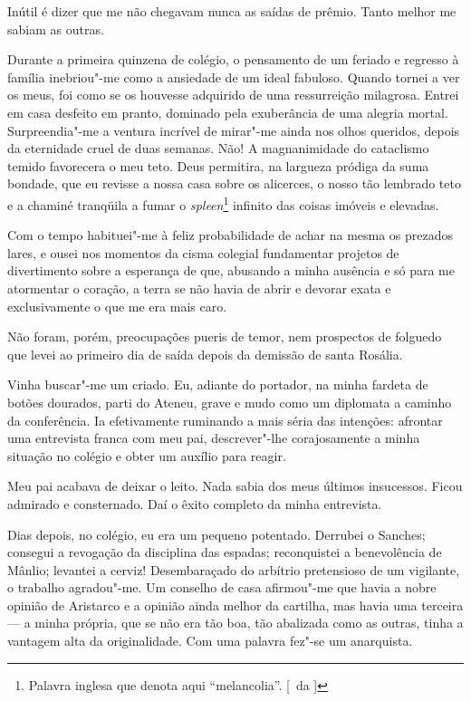Inútil é dizer que me não chegavam nunca as
saídas de prêmio. Tanto melhor me sabiam as outras. 

Durante a primeira
quinzena de colégio, o pensamento de um feriado e regresso à família
inebriou"-me como a ansiedade de um ideal fabuloso. Quando tornei a ver
os meus, foi como se os houvesse adquirido de uma ressurreição
milagrosa. Entrei em casa desfeito em pranto, dominado pela exuberância
de uma alegria mortal. Surpreendia"-me a ventura incrível de
mirar"-me ainda nos olhos queridos, depois da eternidade cruel de duas
semanas. Não! A magnanimidade do cataclismo temido favorecera o meu
teto. Deus permitira, na largueza pródiga da suma bondade, que eu
revisse a nossa casa sobre os alicerces, o nosso tão lembrado teto e a
chaminé tranqüila a fumar o \textit{spleen}\footnote{ Palavra inglesa que denota aqui ``melancolia''. 
[~da ]} infinito das coisas imóveis e elevadas. 

Com o tempo habituei"-me à feliz probabilidade de achar na
mesma os prezados lares, e ousei nos momentos da cisma colegial
fundamentar projetos de divertimento sobre a esperança de que, abusando
a minha ausência e só para me atormentar o coração, a terra se não
havia de abrir e devorar exata e exclusivamente o que me era mais caro.

Não foram, porém, preocupações pueris de temor, nem prospectos de
folguedo que levei ao primeiro dia de saída depois da demissão de santa
Rosália. 

Vinha buscar"-me um criado. Eu, adiante do portador, na minha
fardeta de botões dourados, parti do Ateneu, grave e mudo como um
diplomata a caminho da conferência. Ia efetivamente ruminando a mais
séria das intenções: afrontar uma entrevista franca com meu pai,
descrever"-lhe corajosamente a minha situação no colégio e obter um
auxílio para reagir. 

Meu pai acabava de deixar o leito. Nada sabia dos
meus últimos insucessos. Ficou admirado e consternado. Daí o êxito completo 
da minha entrevista. 

Dias depois, no colégio, eu era um pequeno potentado. 
Derrubei o Sanches; consegui a
revogação da disciplina das espadas; reconquistei a benevolência de
Mânlio; levantei a cerviz! Desembaraçado do arbítrio pretensioso de um
vigilante, o trabalho agradou"-me. Um conselho de casa afirmou"-me
que havia a nobre opinião de Aristarco e a opinião ainda melhor da
cartilha, mas havia uma terceira --- a minha própria, que se não era
tão boa, tão abalizada como as outras, tinha a vantagem alta da
originalidade. Com uma palavra fez"-se um anarquista. 

